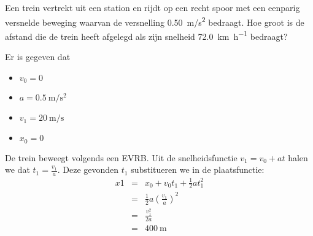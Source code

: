 \documentclass{ximera}
\begin{document}
\begin{exercise}
    Een trein vertrekt uit een station en rijdt op een recht spoor met een eenparig versnelde beweging waarvan de versnelling \SI{0,50}{m/s^2} bedraagt. 
    Hoe groot is de afstand die de trein heeft afgelegd als zijn snelheid \SI{72,0}{\kilo\meter\per\hour} bedraagt?
    \begin{oplossing}
        Er is gegeven dat 
        \begin{itemize}
            \item \(v_0 = 0\)
            \item \(a = \SI{0.5}{\meter\per\second\squared} \) 
            \item \(v_1 = \SI{20}{\meter\per\second}\)
            \item \(x_0 = 0\)
        \end{itemize}
        
        De trein beweegt volgends een EVRB. Uit de snelheidsfunctie \(v_1 = v_0 +at\) halen we dat \(t_1 = \frac{v_1}{a}\). Deze gevonden \(t_1\) substitueren we in de plaatsfunctie: 
        \[
        \begin{array}{rcl}
            x1 &=& x_0 + v_0t_1 + \frac{1}{2}at_1^2\\
            &=& \frac{1}{2}a (\frac{v_1}{a})^2 \\
            &=& \frac{v_1^2}{2a}\\
            &=& \SI{400}{\meter}

            
        \end{array}\]
    \end{oplossing}
\end{exercise}
\end{document}
